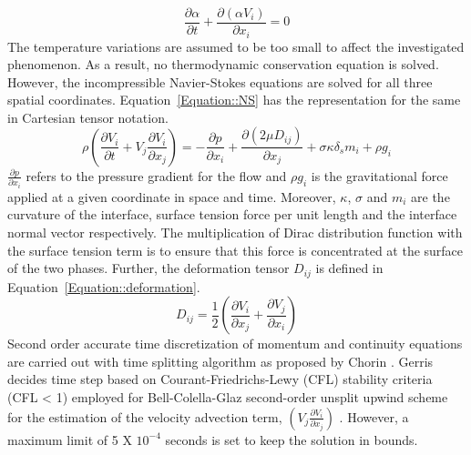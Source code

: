 \begin{equation} \label{Equation::vof}
\frac{\partial \alpha}{\partial t} + \frac{\partial(\alpha V_i)}{\partial x_i} = 0
\end{equation}
The temperature variations are assumed to be too small to affect the investigated phenomenon. As a result, no thermodynamic conservation equation is solved. However, the incompressible Navier-Stokes equations are solved for all three spatial coordinates. Equation~\ref{Equation::NS} has the representation for the same in Cartesian tensor notation. 
\begin{equation} \label{Equation::NS}
\rho\left( \frac{\partial V_i}{\partial t} + V_j\frac{\partial V_i}{\partial x_j} \right) = -\frac{\partial p}{\partial x_i} + \frac{\partial (2\mu D_{ij})}{\partial x_j} + \sigma \kappa \delta_sm_i + \rho g_i
\end{equation}
$\frac{\partial p}{\partial x_i}$ refers to the pressure gradient for the flow and $\rho g_i$ is the gravitational force applied at a given coordinate in space and time. Moreover, $\kappa$, $\sigma$ and $m_i$ are the curvature of the interface, surface tension force per unit length and the interface normal vector respectively. The multiplication of Dirac distribution function with the surface tension term is to ensure that this force is concentrated at the surface of the two phases. Further, the deformation tensor $D_{ij}$ is defined in Equation~\ref{Equation::deformation}.
\begin{equation} \label{Equation::deformation}
D_{ij} = \frac{1}{2}\left(\frac{\partial V_i}{\partial x_j} + \frac{\partial V_j}{\partial x_i}\right)
\end{equation}
Second order accurate time discretization of momentum and continuity equations are carried out with time splitting algorithm as proposed by Chorin \cite{Chorin1968}. Gerris decides time step based on Courant-Friedrichs-Lewy (CFL) stability criteria (CFL < 1) employed for Bell-Colella-Glaz second-order unsplit upwind scheme for the estimation of the velocity advection term, $\left(V_j\frac{\partial V_i}{\partial x_j} \right)$ \cite{popinet2009accurate}. However, a maximum limit of 5 X $10^{-4}$ seconds is set to keep the solution in bounds. \\

